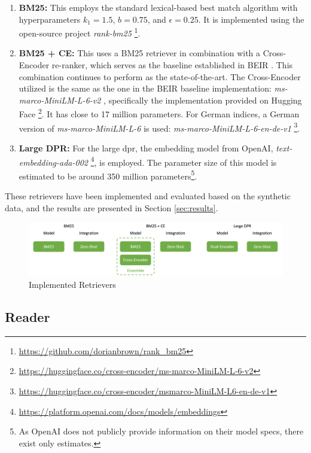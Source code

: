 \begin{enumerate}
    \item \textbf{BM25:} This employs the standard lexical-based best match algorithm with hyperparameters $k_1=1.5$, $b=0.75$, and $\epsilon=0.25$. It is implemented using the open-source project \textit{rank-bm25} \footnote{\url{https://github.com/dorianbrown/rank_bm25}}.
    \item \textbf{BM25 + CE:} This uses a BM25 retriever in combination with a Cross-Encoder re-ranker, which serves as the baseline established in BEIR \cite{thakur_beir_2021}. This combination continues to perform as the state-of-the-art. The Cross-Encoder utilized is the same as the one in the BEIR baseline implementation: \textit{ms-marco-MiniLM-L-6-v2} \cite{wang_minilm_2020}, specifically the implementation provided on Hugging Face \footnote{\url{https://huggingface.co/cross-encoder/ms-marco-MiniLM-L-6-v2}}. It has close to 17 million parameters. For German indices, a German version of \textit{ms-marco-MiniLM-L-6} is used: \textit{ms-marco-MiniLM-L-6-en-de-v1} \footnote{\url{https://huggingface.co/cross-encoder/msmarco-MiniLM-L6-en-de-v1}}.
    \item \textbf{Large DPR:} For the large \gls{dpr}, the embedding model from OpenAI, \textit{text-embedding-ada-002} \footnote{\url{https://platform.openai.com/docs/models/embeddings}}, is employed. The parameter size of this model is estimated to be around 350 million parameters\cite{muennighoff_sgpt_2022}\footnote{As OpenAI does not publicly provide information on their model specs, there exist only estimates.}.
\end{enumerate}

These retrievers have been implemented and evaluated based on the synthetic data, and the results are presented in Section \ref{sec:results}.

\begin{figure}
    \centering
    \includegraphics[width=\textwidth]{Grafiken/Evaluation/retriever_implemented.png}    
    \caption{Implemented Retrievers}
    \label{fig:retriever-implementation}
\end{figure}

\subsection{Reader}
\label{subsec:reader-impl}

